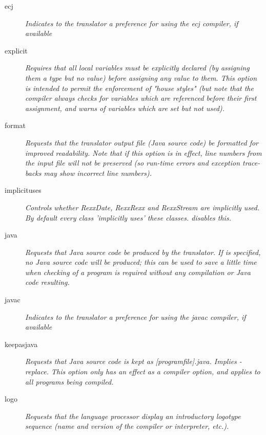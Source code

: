 \begin{description}
\item[ecj]
\emph{Indicates to the translator a preference for using the
  \emph{ecj} compiler, if available}


\item[explicit]

\emph{Requires that all local variables must be explicitly declared (by
assigning them a type but no value) before assigning any value to them.
This option is intended to permit the enforcement of "house styles"
(but note that the \nr{} compiler always checks for variables which
are referenced before their first assignment, and warns of variables
which are set but not used).}
\item[format]
\emph{Requests that the translator output file (Java source code) be
formatted for improved readability.
Note that if this option is in effect, line numbers from the input file
will not be preserved (so run-time errors and exception trace-backs may
show incorrect line numbers).}
\item[implicituses]
\emph{Controls whether RexxDate, RexxRexx and RexxStream are implicitly used. 
By default every class 'implicitly uses' these classes. 
disables this.}

\item[java]

\emph{Requests that Java source code be produced by the translator.
If  is specified, no Java source code will be produced;
this can be used to save a little time when checking of a program is
required without any compilation or Java code resulting.}

\item[javac]
\emph{Indicates to the translator a preference for using the
  \emph{javac} compiler, if available}

\item[keepasjava]
\emph{Requests that Java source code is kept as
  [programfile].java. Implies -replace. This option only has an effect
  as a compiler option, and applies to all programs being compiled.}

\item[logo]
\emph{Requests that the language processor display an introductory
logotype sequence (name and version of the compiler or interpreter,
\emph{etc.}).}


\end{description}

